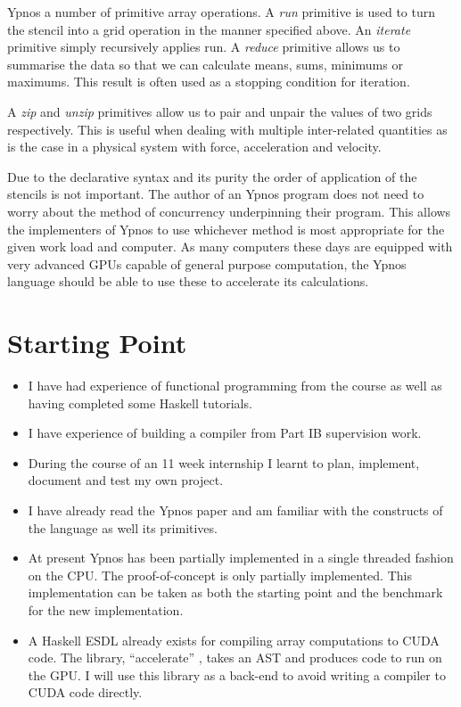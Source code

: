 Ypnos a number of primitive array operations. A \emph{run} primitive is used to 
turn the stencil into a grid operation in the manner specified above. An 
\emph{iterate} primitive simply recursively applies run.  A \emph{reduce} 
primitive allows us to summarise the data so that we can calculate means, sums, 
minimums or maximums.  This result is often used as a stopping condition for 
iteration.

A \emph{zip} and \emph{unzip} primitives allow us to pair and unpair the values 
of two grids respectively. This is useful when dealing with multiple 
inter-related quantities as is the case in a physical system with force, 
acceleration and velocity.

Due to the declarative syntax and its purity the order of application of the 
stencils is not important. The author of an Ypnos program does not need to 
worry about the method of concurrency underpinning their program. This allows 
the implementers of Ypnos to use whichever method is most appropriate for the 
given work load and computer. As many computers these days are equipped with 
very advanced GPUs capable of general purpose computation, the Ypnos language 
should be able to use these to accelerate its calculations.

\section*{Starting Point}

\begin{itemize}

\item I have had experience of functional programming from the course as well 
as having completed some Haskell tutorials. 

\item I have experience of building a compiler from Part IB supervision work.

\item During the course of an 11 week internship I learnt to plan, implement, 
document and test my own project.

\item I have already read the Ypnos paper and am familiar with the constructs 
of the language as well its primitives.

\item At present Ypnos has been partially implemented in a single threaded 
fashion on the CPU. The proof-of-concept is only partially implemented. This 
implementation can be taken as both the starting point and the benchmark for 
the new implementation.

\item A Haskell ESDL already exists for compiling array computations to CUDA 
code. The library, ``accelerate'' \cite{accel}, takes an AST and produces code
to run on the GPU.  I will use this library as a back-end to avoid writing a 
compiler to CUDA code directly.

\end{itemize}

